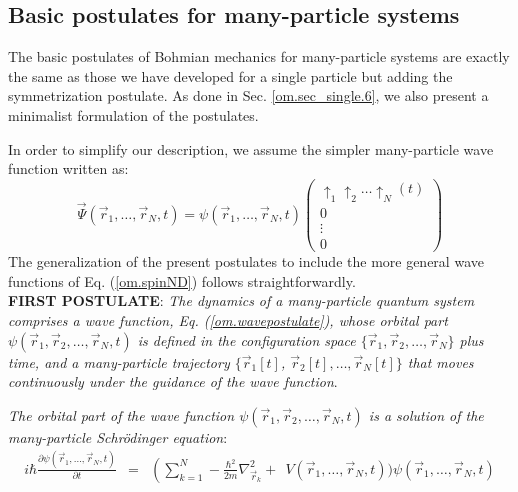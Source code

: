 \documentclass[nofootinbib, secnumarabic, amsmath, nobibnotes,11pt,aps,pra, floatfix]{revtex4-1}
\newcommand{\sref}[1]{Sec. \ref{#1}}
\newcommand{\eref}[1]{Eq. (\ref{#1})}
\begin{document}
\subsection{Basic postulates  for many-particle systems}\label{om.sec_many.5}

The basic postulates of Bohmian mechanics for many-particle systems are exactly the same as those we have developed for a single particle but adding the symmetrization postulate. As done in \sref{om.sec_single.6}, we also present a minimalist formulation of the postulates.

\enlargethispage{-1pc}
In order to simplify our description, we assume the simpler many-particle wave function written as:
\begin{equation}
\label{om.wavepostulate}
\vec \Psi(\vec r_1,\ldots,\vec r_N,t) = \psi(\vec r_1,\ldots,\vec r_N,t)\left(
\begin{array}{c}
\uparrow_1 \uparrow_2\ldots\uparrow_N(t) \\ 0 \\ \vdots \\ 0
\end{array}
\right)
\end{equation}
The generalization of the present postulates to include the more general wave functions of \eref{om.spinND} follows straightforwardly. \\


\noindent\textbf{FIRST POSTULATE}: \textit{The dynamics of a many-particle quantum  system comprises a wave function,
\eref{om.wavepostulate}, whose orbital  part $\psi(\vec r_1,\vec r_2,\ldots,\vec r_N,t)$ is defined in the configuration space 
$\{\vec r_1,\vec r_2,\ldots,\vec r_N\}$ plus time, and a many-particle trajectory $\{\vec r_1[t]$, $\vec r_2[t],\ldots,\vec r_N[t]\}$ that moves continuously under the guidance of the wave function}.

\textit{The orbital part of the wave function $\psi(\vec r_1,\vec r_2,\ldots,\vec r_N,t)$ is a solution of the many-particle Schr\"odinger equation}:
\begin{eqnarray*}
i \hbar \frac{\partial \psi(\vec r_{1},\ldots,\vec
r_{N},t)}{\partial t} &=& \left( \sum_{k = 1}^N -\frac{\hbar^2}{2m}
\nabla^2_{\vec r_k} \right.+\ \ V(\vec r_{1},\ldots,\vec r_{N},t) \Bigg)
\psi(\vec r_{1},\ldots,\vec r_{N},t)
\end{eqnarray*}
\end{document}
